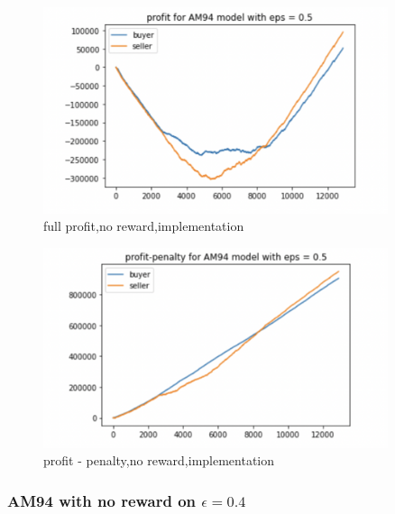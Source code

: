 \documentclass[11pt]{article}
\begin{document}
\begin{figure}[H]
	\begin{center}
	\includegraphics[width=0.9\textwidth]{23.PNG}
	\end{center}
	\caption{full profit,no reward,implementation}
	\label{FIG.23}
\end{figure}

\begin{figure}[H]
	\begin{center}
	\includegraphics[width=0.9\textwidth]{24.PNG}
	\end{center}
	\caption{profit - penalty,no reward,implementation}
	\label{FIG.24}
\end{figure}

\subsubsection{AM94 with no reward on $\epsilon = 0.4$}
\end{document}
